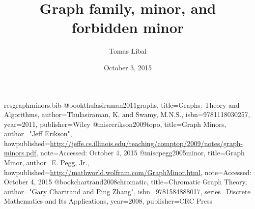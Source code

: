 \begin{filecontents*}{resgraphminors.bib}
@book{thulasiraman2011graphs,
  title={Graphs: Theory and Algorithms},
  author={Thulasiraman, K. and Swamy, M.N.S.},
  isbn={9781118030257},
  year={2011},
  publisher={Wiley}
}
@misc{erikson2009topo,
	title={Graph Minors},
	author="Jeff {Erikson}",
	howpublished={\url{http://jeffe.cs.illinois.edu/teaching/comptop/2009/notes/graph-minors.pdf}},
	note={Accessed: October 4, 2015}
}
@misc{pegg2005minor,
	title={Graph Minor},
	author={E. Pegg, Jr.},
	howpublished={\url{http://mathworld.wolfram.com/GraphMinor.html}},
	note={Accessed: October 4, 2015}
}
@book{chartrand2008chromatic,
  title={Chromatic Graph Theory},
  author="Gary {Chartrand} and Ping {Zhang}",
  isbn={9781584888017},
  series={Discrete Mathematics and Its Applications},
  year={2008},
  publisher={CRC Press}
}
\end{filecontents*}

\documentclass[11pt]{article}

\title{Graph family, minor, and forbidden minor}
\author{Tomas Libal}
\date{October 3, 2015}

\usepackage{tikz}
\usepackage{caption}
\usepackage{subcaption}

\usepackage[backend=biber]{biblatex}




\maketitle

\section{Subgraphs}

A subgraph $ H = (V', E') $ of $ G = (V, E) $ is a graph whose vertex $ V' $ set is a subset of $ V $ and the edge set $ E' $ is a subset of $ E $. By the definition of a set, every set is subset of itself, so every graph is a subgraph of itself as well.

\textit{Induced subgraph} $ H = (V', E') $ on a vertex set $ V' \subseteq V $ is called vertex-induced subgraph if $ E' $ contains automatically all edges from $ E $ which have vertices in $ V' $.

Conversely, an induced subgraph $ I = (V'', E'') $ on an edge set $ E'' \subseteq E $ is called an edge-induced subgraph if all vertices in $ V'' $ are in $ E'' $ and there are no isolated vertices~\autocite[5]{thulasiraman2011graphs}.

